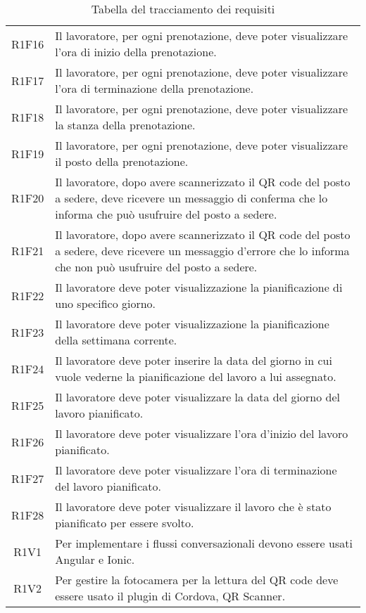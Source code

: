 \begin{table}[h]%
		\renewcommand{\arraystretch}{1.5}
	\centering
	\begin{tabularx}{\textwidth}{c X}
		\hline		
		\rowcolor{heavenly}
		\intest{Codice} &  \intest{Descrizione} \\	
		\hline
		R1F16 & Il lavoratore, per ogni prenotazione, deve poter visualizzare l'ora di inizio della prenotazione.\\
		R1F17 & Il lavoratore, per ogni prenotazione, deve poter visualizzare l'ora di terminazione della prenotazione.\\		
		R1F18 & Il lavoratore, per ogni prenotazione, deve poter visualizzare la stanza della prenotazione.\\
		R1F19 & Il lavoratore, per ogni prenotazione, deve poter visualizzare il posto della prenotazione.\\	
		R1F20 & Il lavoratore, dopo avere scannerizzato il \gls{QR code}\ap{[g]} del posto a sedere, deve ricevere un messaggio di conferma che lo informa che può usufruire del posto a sedere.\\
		R1F21 & Il lavoratore, dopo avere scannerizzato il \gls{QR code}\ap{[g]} del posto a sedere, deve ricevere un messaggio d'errore che lo informa che non può usufruire del posto a sedere.\\
		R1F22 & Il lavoratore deve poter visualizzazione la pianificazione di uno specifico giorno.\\
		R1F23 & Il lavoratore deve poter visualizzazione la pianificazione della settimana corrente.\\
		R1F24 & Il lavoratore deve poter inserire la data del giorno in cui vuole vederne la pianificazione del lavoro a lui assegnato.\\
		R1F25 & Il lavoratore deve poter visualizzare la data del giorno del lavoro pianificato.\\
		R1F26 & Il lavoratore deve poter visualizzare l'ora d'inizio del lavoro pianificato.\\
		R1F27 & Il lavoratore deve poter visualizzare l'ora di terminazione del lavoro pianificato.\\
		R1F28 & Il lavoratore deve poter visualizzare il lavoro che è stato pianificato per essere svolto.\\
		R1V1 & Per implementare i flussi conversazionali devono essere usati Angular e Ionic.\\
		R1V2 & Per gestire la fotocamera per la lettura del \gls{QR code}\ap{[g]} deve essere usato il plugin di Cordova, QR Scanner.\\
		\hline	
	\end{tabularx} \hbox{}
	\caption{Tabella del tracciamento dei requisiti}
\end{table}%
\clearpage
